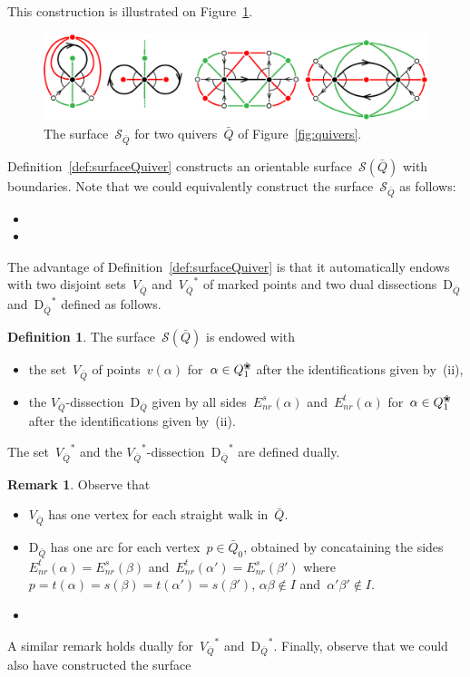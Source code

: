 \documentclass{amsart}
\theoremstyle{definition}
\newtheorem{definition}[theorem]{Definition}
\newtheorem{remark}[theorem]{Remark}
\newcommand{\fref}[1]{Figure~\ref{#1}} %
\newcommand{\vincent}[1]{\todo[color=blue!30]{#1 \\ \hfill --- V.}}
\newcommand{\blossom}{^\text{\ding{96}}} %
\newcommand{\Enrs}[1]{E_{nr}^{s}(#1)}
\newcommand{\Enrt}[1]{E_{nr}^{t}(#1)}
\newcommand{\surface}{\mathcal{S}} %
\newcommand{\dual}{^*} %
\newcommand{\dissection}{\mathrm{D}} %
\begin{document}
This construction is illustrated on \fref{fig:examplesSurfaces}.
%
\begin{figure}[t]
	\capstart
	\centerline{\includegraphics[scale=.7]{examplesSurfaces}}
	\caption{The surface~$\surface_{\bar Q}$ for two quivers~$\bar Q$ of \fref{fig:quivers}.}
	\label{fig:examplesSurfaces}
\end{figure}
%
Definition~\ref{def:surfaceQuiver} constructs an orientable surface~$\surface(\bar Q)$ with boundaries.
Note that we could equivalently construct the surface~$\surface_{\bar Q}$ as follows:
\begin{itemize}
\item 
\item
\end{itemize}
\vincent{TODO}
The advantage of Definition~\ref{def:surfaceQuiver} is that it automatically endows with two disjoint sets~$V_{\bar Q}$ and~${V_{\bar Q}}\dual$ of marked points and two dual dissections~$\dissection_{\bar Q}$ and~${\dissection_{\bar Q}}\dual$ defined as follows.

\begin{definition}
\label{def:dissectionQuiver}
The surface~$\surface(\bar Q)$ is endowed with
\begin{itemize}
\item the set~$V_{\bar Q}$ of points~$v(\alpha)$ for~$\alpha \in Q_1\blossom$ after the identifications given by~(ii),
\item the $V_{\bar Q}$-dissection~$\dissection_{\bar Q}$ given by all sides~$\Enrs{\alpha}$ and~$\Enrt{\alpha}$ for~$\alpha \in Q_1\blossom$ after the identifications given by~(ii).
\end{itemize}
The set~${V_{\bar Q}}\dual$ and the ${V_{\bar Q}}\dual$-dissection~${\dissection_{\bar Q}}\dual$ are defined dually.
\end{definition}

\begin{remark}
Observe that
\begin{itemize}
\item $V_{\bar Q}$ has one vertex for each straight walk in~$\bar Q$.
\item $\dissection_{\bar Q}$ has one arc for each vertex~$p \in \bar Q_0$, obtained by concataining the sides~$\Enrt{\alpha} = \Enrs{\beta}$ and~$\Enrt{\alpha'} = \Enrs{\beta'}$ where~$p = t(\alpha) = s(\beta) = t(\alpha') = s(\beta')$, $\alpha\beta \notin I$ and~$\alpha'\beta' \notin I$.
\item 
\end{itemize}
\vincent{TODO}
A similar remark holds dually for~${V_{\bar Q}}\dual$ and~${\dissection_{\bar Q}}\dual$.
Finally, observe that we could also have constructed the surface
\end{remark}
\end{document}
